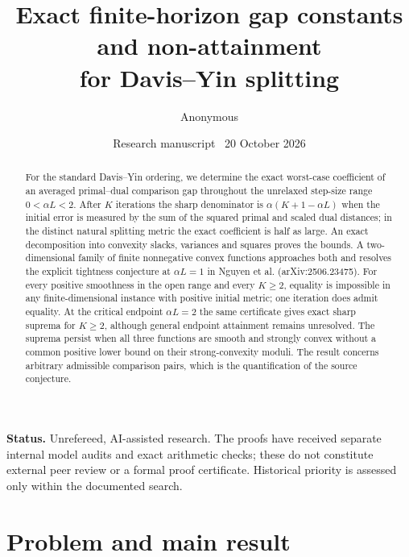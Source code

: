 \documentclass[11pt,a4paper]{article}
\title{Exact finite-horizon gap constants and non-attainment\protect\\for Davis--Yin splitting}
\author{Anonymous}
\date{Research manuscript \textbullet\ 20 October 2026}
\theoremstyle{remark}\newtheorem{remark}[theorem]{Remark}
\begin{document}
\maketitle
\vspace{-1.5em}
\begin{abstract}
For the standard Davis--Yin ordering, we determine the exact worst-case coefficient of an averaged primal--dual comparison gap throughout the unrelaxed step-size range $0<\alpha L<2$. After $K$ iterations the sharp denominator is $\alpha(K+1-\alpha L)$ when the initial error is measured by the sum of the squared primal and scaled dual distances; in the distinct natural splitting metric the exact coefficient is half as large. An exact decomposition into convexity slacks, variances and squares proves the bounds. A two-dimensional family of finite nonnegative convex functions approaches both and resolves the explicit tightness conjecture at $\alpha L=1$ in Nguyen et al. (arXiv:2506.23475). For every positive smoothness in the open range and every $K\ge2$, equality is impossible in any finite-dimensional instance with positive initial metric; one iteration does admit equality. At the critical endpoint $\alpha L=2$ the same certificate gives exact sharp suprema for $K\ge2$, although general endpoint attainment remains unresolved. The suprema persist when all three functions are smooth and strongly convex without a common positive lower bound on their strong-convexity moduli. The result concerns arbitrary admissible comparison pairs, which is the quantification of the source conjecture.
\end{abstract}
\noindent\textbf{Status.} Unrefereed, AI-assisted research. The proofs have received separate internal model audits and exact arithmetic checks; these do not constitute external peer review or a formal proof certificate. Historical priority is assessed only within the documented search.

\section{Problem and main result}
\end{document}
